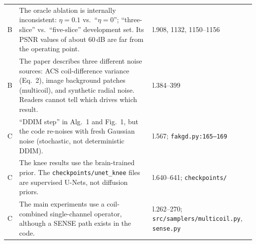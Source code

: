\documentclass[10pt,a4paper]{article}
\newcommand{\code}[1]{\texttt{\small #1}}
\begin{document}
\begin{center}
\begin{tabularx}{\linewidth}{@{}c L L@{}}
B & The oracle ablation is internally inconsistent: $\eta=0.1$ vs.\ ``$\eta=0$''; ``three-slice'' vs.\ ``five-slice'' development set. Its PSNR values of about 60\,dB are far from the operating point. & l.908, 1132, 1150--1156\\
B & The paper describes three different noise sources: ACS coil-difference variance (Eq.~2), image background patches (multicoil), and synthetic radial noise. Readers cannot tell which drives which result. & l.384--399\\
C & ``DDIM step'' in Alg.~1 and Fig.~1, but the code re-noises with fresh Gaussian noise (stochastic, not deterministic DDIM). & l.567; \code{fakgd.py:165--169}\\
C & The knee results use the brain-trained prior. The \code{checkpoints/unet\_knee} files are supervised U-Nets, not diffusion priors. & l.640--641; \code{checkpoints/}\\
C & The main experiments use a coil-combined single-channel operator, although a SENSE path exists in the code. & l.262--270; \code{src/samplers/multicoil.py}, \code{sense.py}\\
\bottomrule
\end{tabularx}
\end{center}

\end{document}
